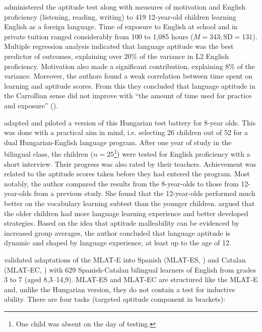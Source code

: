 \documentclass[output=paper]{langscibook}
\begin{document}
\citet{KissNikolov2005} administered the aptitude test along with measures of motivation and English proficiency (listening, reading, writing) to 419 12-year-old children learning English as a foreign language. Time of exposure to English at school and in private tuition ranged considerably from 100 to 1,085 hours ($M= 343; \text{SD}= 131$). Multiple regression analysis indicated that language aptitude was the best predictor of outcomes, explaining over 20\% of the variance in L2 English proficiency. Motivation also made a significant contribution, explaining 8\% of the variance. Moreover, the authors found a weak correlation between time spent on learning and aptitude scores. From this they concluded that language aptitude in the Carrollian sense did not improve with “the amount of time used for practice and exposure” (\citealt[134]{KissNikolov2005}).

\citet{Kiss2009} adapted and piloted a version of this Hungarian test battery for 8-year olds. This was done with a practical aim in mind, i.e. selecting 26 children out of 52 for a dual Hungarian-English language program. After one year of study in the bilingual class, the children ($n=25$\footnote{One child was absent on the day of testing.}) were tested for English proficiency with a short interview. Their progress was also rated by their teachers. Achievement was related to the aptitude scores taken before they had entered the program. Most notably, the author compared the results from the 8-year-olds to those from 12-year-olds from a previous study. She found that the 12-year-olds performed much better on the vocabulary learning subtest than the younger children. \citet{Kiss2009} argued that the older children had more language learning experience and better developed strategies. Based on the idea that aptitude malleability can be evidenced by increased group averages, the author concluded that language aptitude is dynamic and shaped by language experience, at least up to the age of 12.

\begin{sloppypar}
\citet{SuarezVilagran2010} validated adaptations of the MLAT-E into Spanish (MLAT-ES, \citealt{StansfieldReed2005}) and Catalan (MLAT-EC, \citealt{SuarezVilagran2010}) with 629 Spanish-Catalan bilingual learners of English from grades 3 to 7 (aged 8,3--14,9). MLAT-ES and MLAT-EC are structured like the MLAT-E and, unlike the Hungarian version, they do not contain a test for inductive ability. There are four tasks (targeted aptitude component in brackets): 
\end{sloppypar}
\end{document}
